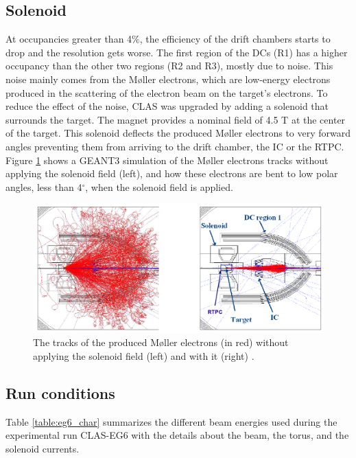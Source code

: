 \subsection{Solenoid}
At occupancies greater than 4$\%$, the efficiency of the drift chambers 
starts to drop and the resolution gets worse. The first region of the DCs (R1) 
has a higher occupancy than the other two regions (R2 and R3), mostly due to 
noise. This noise mainly comes from the M\o ller electrons, which are 
low-energy electrons produced in the scattering of the electron beam on the 
target's electrons. To reduce the effect of the noise, CLAS was upgraded by 
adding a solenoid that surrounds the target. The magnet provides a nominal 
field of 4.5 T at the center of the target. This solenoid deflects the produced 
M\o ller electrons to very forward angles preventing them from arriving to the 
drift chamber, the IC or the RTPC. Figure \ref{fig:solenoid} shows a GEANT3 simulation of the 
M\o ller electrons tracks without applying the solenoid field (left), and how 
these electrons are bent to low polar angles, less than 4$^{\circ}$, when the 
solenoid field is applied.

 
\begin{figure}[tp]
\centering
\includegraphics[scale=0.36]{fig/solenoid.png}
\caption{The tracks of the produced M\o ller electrons (in red) without 
applying the solenoid field (left) and with it (right) 
\cite{Hyon-suk}. } \label{fig:solenoid}
\end{figure}

\subsection{Run conditions}

Table \ref{table:eg6_char} summarizes the different beam energies used during 
the experimental run CLAS-EG6 with the details about the beam, the torus, and 
the solenoid currents.  

